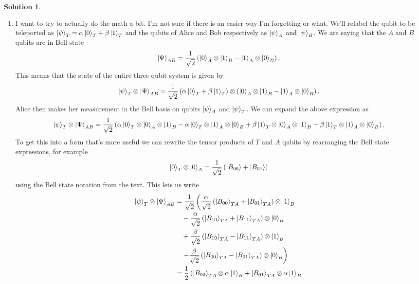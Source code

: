 \documentclass[10pt]{article}
\theoremstyle{definition}
\newtheorem{soln}{Solution}
\begin{document}
\begin{soln}~
  \begin{enumerate}[label=(\alph*)]
    \item I want to try to actually do the math a bit. I'm not sure if there is an easier way I'm forgetting or what.
          We'll relabel the qubit to be teleported as $\ket{\psi}_{T}=\alpha\ket{0}_T+\beta\ket{1}_T$ and the qubits of Alice and Bob respectively as
          $\ket{\psi}_A$ and $\ket{\psi}_B$. We are saying that the $A$ and $B$ qubits are in Bell state
          $$\ket{\Psi}_{AB}=\frac{1}{\sqrt{2}}\left(\ket{0}_A\otimes\ket{1}_B-\ket{1}_A\otimes \ket{0}_B\right).$$
          This means that the state of the entire three qubit system is given by
          $$\ket{\psi}_{T}\otimes \ket{\Psi}_{AB}=\frac{1}{\sqrt{2}}\left(\alpha\ket{0}_T+\beta\ket{1}_T\right)\otimes\left(\ket{0}_A\otimes\ket{1}_B-\ket{1}_A\otimes \ket{0}_B\right).$$
          Alice then makes her measurement in the Bell basis on qubits $\ket{\psi}_A$ and $\ket{\psi}_{T}$. We can expand the above expression as 
          $$\ket{\psi}_{T}\otimes \ket{\Psi}_{AB}=
          \frac{1}{\sqrt{2}}\left(\alpha\ket{0}_T\otimes\ket{0}_A\otimes\ket{1}_B-\alpha\ket{0}_T\otimes\ket{1}_A\otimes \ket{0}_B
          +\beta\ket{1}_T\otimes\ket{0}_A\otimes\ket{1}_B-\beta\ket{1}_T\otimes\ket{1}_A\otimes \ket{0}_B\right).$$
          To get this into a form that's more useful we can rewrite the tensor products of $T$ and $A$ qubits by rearranging the Bell state expressions, for example
          $$\ket{0}_T\otimes\ket{0}_A=\frac{1}{\sqrt{2}}\left(\ket{B_{00}}+\ket{B_{01}}\right)$$
          using the Bell state notation from the text. This lets us write 
          \begin{align*}
            \ket{\psi}_{T}\otimes \ket{\Psi}_{AB}&=
          \frac{1}{\sqrt{2}}\left(\frac{\alpha}{\sqrt{2}}\left(\ket{B_{00}}_{TA}+\ket{B_{01}}_{TA}\right)\otimes\ket{1}_B\right.\\
          &\quad-\frac{\alpha}{\sqrt{2}}\left(\ket{B_{10}}_{TA}+\ket{B_{11}}_{TA}\right)\otimes \ket{0}_B\\
          &\quad+\frac{\beta}{\sqrt{2}}\left(\ket{B_{10}}_{TA}-\ket{B_{11}}_{TA}\right)\otimes\ket{1}_B\\
          &\quad\left.-\frac{\beta}{\sqrt{2}}\left(\ket{B_{00}}_{TA}-\ket{B_{01}}_{TA}\right)\otimes \ket{0}_B\right)\\
          &=
          \frac{1}{2}\left(\ket{B_{00}}_{TA}\otimes\alpha\ket{1}_B+\ket{B_{01}}_{TA}\otimes\alpha\ket{1}_B\right.\\

\end{align*}
\end{enumerate}
\end{soln}
\end{document}
